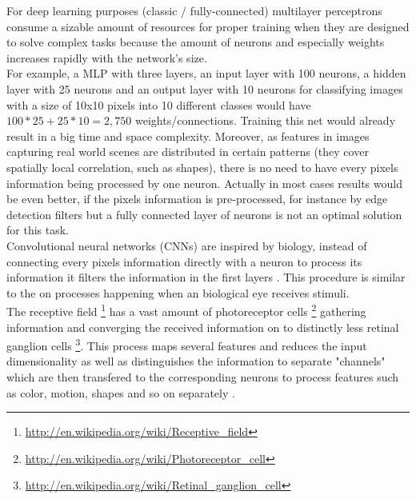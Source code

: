 \documentclass[12pt,twoside]{article}
\theoremstyle{plain}
\theoremstyle{definition}
\theoremstyle{remark}
\begin{document}
For deep learning purposes (classic / fully-connected) multilayer perceptrons consume a sizable amount of resources for proper training when they are designed to solve complex tasks because the amount of neurons and especially weights increases rapidly with the network's size.
\\
For example, a MLP with three layers, an input layer with 100 neurons, a hidden layer with 25 neurons and an output layer with 10 neurons for classifying images with a size of 10x10 pixels into 10 different classes would have $100 * 25 + 25 * 10 = 2,750$ weights/connections. Training this net would already result in a big time and space complexity. Moreover, as features in images capturing real world scenes are distributed in certain patterns (they cover spatially local correlation, such as shapes), there is no need to have every pixels information being processed by one neuron. Actually in most cases results would be even better, if the pixels information is pre-processed, for instance by edge detection filters but a fully connected layer of neurons is not an optimal solution for this task.
\\
Convolutional neural networks (CNNs) are inspired by biology, instead of connecting every pixels information directly with a neuron to process its information it filters the information in the first layers \cite{ImangeNetClassificationCNN-Krizhevsky}. This procedure is similar to the on processes happening when an biological eye receives stimuli.
\\
The receptive field \footnote{\url{http://en.wikipedia.org/wiki/Receptive_field}} has a vast amount of photoreceptor cells \footnote{\url{http://en.wikipedia.org/wiki/Photoreceptor_cell}} gathering information and converging the received information on to distinctly less retinal ganglion cells \footnote{\url{http://en.wikipedia.org/wiki/Retinal_ganglion_cell}}. This process maps several features and reduces the input dimensionality as well as distinguishes the information to separate "channels" which are then transfered to the corresponding neurons to process features such as color, motion, shapes and so on separately \cite{DeepHierarchiesVisualCortex-kruger}.
\end{document}
